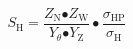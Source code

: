 \[S_{\mathrm{H}}\mathrm{=}\frac{Z_{\mathrm{N}}\mathrm{\bullet }Z_{\mathrm{W}}}{Y_{\theta }\mathrm{\bullet }Y_{\mathrm{Z}}}\bullet \frac{{\sigma }_{\mathrm{HP}}}{{\sigma }_{\mathrm{H}}}\]